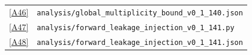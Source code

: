 \documentclass[twocolumn,linenumbers]{aastex702}
\newcommand{\repoBase}{https://github.com/Hubify-Projects/bigbounce/blob/main}
\begin{document}
\begin{table}[p]
{\begin{ruledtabular}
\begin{tabular}{lp{}}
\href{\repoBase/pipelines/p5\_desi\_chirality/analysis/global\_multiplicity\_bound\_v0\_1\_140.json}{[A46]} & \texttt{analysis/global\_multiplicity\_bound\_v0\_1\_140.json} \\
\href{\repoBase/pipelines/p5\_desi\_chirality/analysis/forward\_leakage\_injection\_v0\_1\_141.py}{[A47]} & \texttt{analysis/forward\_leakage\_injection\_v0\_1\_141.py} \\
\href{\repoBase/pipelines/p5\_desi\_chirality/analysis/forward\_leakage\_injection\_v0\_1\_141.json}{[A48]} & \texttt{analysis/forward\_leakage\_injection\_v0\_1\_141.json} \\
\end{tabular}
\end{ruledtabular}
}%
\end{table}
\clearpage
\end{document}
